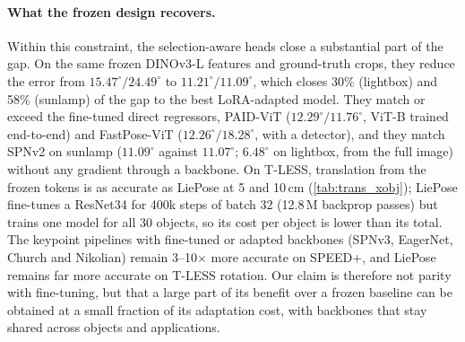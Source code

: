 \paragraph{What the frozen design recovers.} Within this constraint, the selection-aware heads close a substantial part of the gap. On the same frozen DINOv3-L features and ground-truth crops, they reduce the error from $15.47^\circ/24.49^\circ$ to $11.21^\circ/11.09^\circ$, which closes 30\% (lightbox) and 58\% (sunlamp) of the gap to the best LoRA-adapted model. They match or exceed the fine-tuned direct regressors, PAID-ViT ($12.29^\circ/11.76^\circ$, ViT-B trained end-to-end) and FastPose-ViT ($12.26^\circ/18.28^\circ$, with a detector), and they match SPNv2 on sunlamp ($11.09^\circ$ against $11.07^\circ$; $6.48^\circ$ on lightbox, from the full image) without any gradient through a backbone. On T-LESS, translation from the frozen tokens is as accurate as LiePose at 5 and 10\,cm (\cref{tab:trans_xobj}); LiePose fine-tunes a ResNet34 for 400k steps of batch 32 (12.8\,M backprop passes) but trains one model for all 30 objects, so its cost per object is lower than its total. The keypoint pipelines with fine-tuned or adapted backbones (SPNv3, EagerNet, Church and Nikolian) remain 3--10$\times$ more accurate on SPEED+, and LiePose remains far more accurate on T-LESS rotation. Our claim is therefore not parity with fine-tuning, but that a large part of its benefit over a frozen baseline can be obtained at a small fraction of its adaptation cost, with backbones that stay shared across objects and applications.

